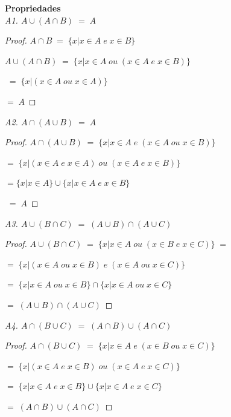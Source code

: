 \noindent
\textbf{Propriedades} \\

\noindent
\emph{A1. $ A \cup (A \cap B) \; = \; A $ }
\begin{proof}
	$ A \cap B \; = \; \{ x | x \in A \; e \; x \in B \} $ 
	
	$ A \cup (A \cap B) \; = \; \{ x | x \in A \; ou \; (x \in A \; e \; x \in B) \}$
	
	$\; = \; \{ x | (x \in A \; ou \; x \in A) \} $
	
	$ = \; A $
	
\end{proof}

\noindent
\emph{A2. $ A \cap (A \cup B) \; = \; A$}
\begin{proof}
	$ A \cap (A \cup B) \; = \; \{ x | x \in A \; e \; (x \in A \; ou \; x \in B) \} $
	
	$ = \; \{ x | (x \in A \; e \; x \in A) \; ou \; (x \in A \; e \; x \in B) \} $ 
	
	$  = \{ x | x \in A \} \cup \{ x | x \in A \; e \; x \in B \} $ 
	
	$\; = \; A $
\end{proof} 

\noindent
\emph{A3. $A \cup (B \cap C ) \; = \; (A \cup B) \cap (A \cup C) $ }
\begin{proof}
	$ A \cup (B \cap C) \; = \; \{ x | x \in A \; ou \; (x \in B \; e \; x \in C)  \} \; = \; $
	
	$ = \; \{ x | (x \in A \; ou \; x \in B) \; e \; (x \in A \; ou \; x \in C) \} $
	
	$ = \; \{ x| x \in A \; ou \; x \in B \} \cap \{ x | x \in A \; ou \; x \in C \} $ 
	
	$ = \; (A \cup B) \cap (A \cup C) $  
	
\end{proof}

\noindent
\emph{A4. $  A \cap (B \cup C) \; = \; (A \cap B) \cup (A \cap C) $}
\begin{proof}
	$ A \cap ( B \cup C) \; = \; \{ x | x \in A \; e \; ( x \in B \; ou \; x \in C)  \} $
	
	$ = \; \{ x | (x \in A \; e \; x \in B) \; ou \; ( x \in A \; e \; x \in C)  \} $ 
	
	$ = \; \{ x | x \in A \; e \; x \in B \} \cup \{x | x \in A \; e \; x \in C \} $
	
	$ = \; (A \cap B) \cup (A \cap C)$
\end{proof}


